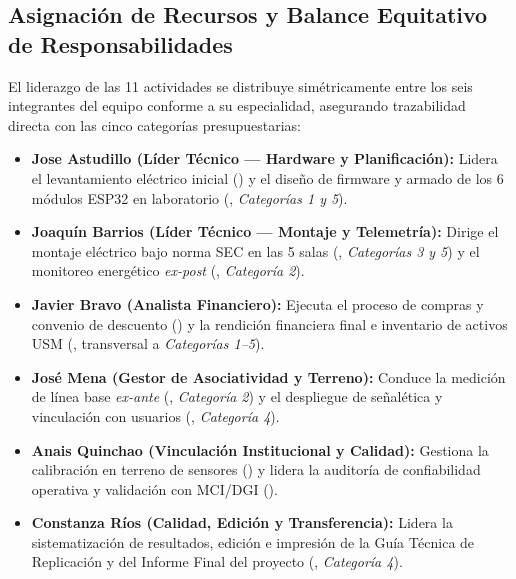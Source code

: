 \subsection{Asignación de Recursos y Balance Equitativo de Responsabilidades}
El liderazgo de las 11 actividades se distribuye simétricamente entre los seis integrantes del equipo conforme a su especialidad, asegurando trazabilidad directa con las cinco categorías presupuestarias:
\begin{itemize}
    \item \textbf{Jose Astudillo (Líder Técnico --- Hardware y Planificación):} Lidera el levantamiento eléctrico inicial () y el diseño de firmware y armado de los 6 módulos ESP32 en laboratorio (, \textit{Categorías 1 y 5}).
    \item \textbf{Joaquín Barrios (Líder Técnico --- Montaje y Telemetría):} Dirige el montaje eléctrico bajo norma SEC en las 5 salas (, \textit{Categorías 3 y 5}) y el monitoreo energético \textit{ex-post} (, \textit{Categoría 2}).
    \item \textbf{Javier Bravo (Analista Financiero):} Ejecuta el proceso de compras y convenio de descuento () y la rendición financiera final e inventario de activos USM (, transversal a \textit{Categorías 1--5}).
    \item \textbf{José Mena (Gestor de Asociatividad y Terreno):} Conduce la medición de línea base \textit{ex-ante} (, \textit{Categoría 2}) y el despliegue de señalética y vinculación con usuarios (, \textit{Categoría 4}).
    \item \textbf{Anais Quinchao (Vinculación Institucional y Calidad):} Gestiona la calibración en terreno de sensores () y lidera la auditoría de confiabilidad operativa y validación con MCI/DGI ().
    \item \textbf{Constanza Ríos (Calidad, Edición y Transferencia):} Lidera la sistematización de resultados, edición e impresión de la Guía Técnica de Replicación y del Informe Final del proyecto (, \textit{Categoría 4}).
\end{itemize}
